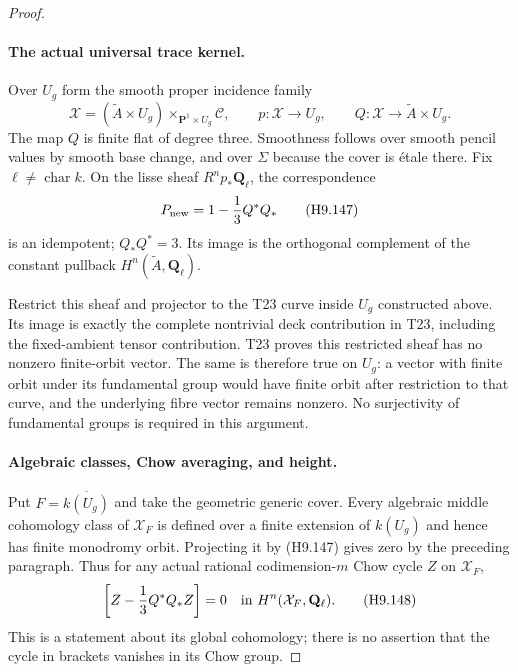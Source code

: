 \begin{proof}
\paragraph{The actual universal trace kernel.}
Over $U_g$ form the smooth proper incidence family
\[
 \mathscr X=(\widetilde A\times U_g)
                    \times_{\mathbf P^1\times U_g}\mathscr C,
 \qquad p:\mathscr X\to U_g,
 \qquad Q:\mathscr X\to\widetilde A\times U_g.
                                                               \tag{H9.146}
\]
The map $Q$ is finite flat of degree three.
Smoothness follows over smooth pencil values by
smooth base change, and over $\Sigma$ because
the cover is \'etale there. Fix $\ell\ne\operatorname{char}k$.
On the lisse sheaf $R^np_*\mathbf Q_\ell$, the
correspondence
\[
                       P_{\rm new}=1-\frac13Q^*Q_*
                                                               \tag{H9.147}
\]
is an idempotent; $Q_*Q^*=3$. Its image is the
orthogonal complement of the constant pullback
$H^n(\widetilde A,\mathbf Q_\ell)$.

Restrict this sheaf and projector to the T23 curve
inside $U_g$ constructed above. Its image is exactly
the complete nontrivial deck contribution in T23,
including the fixed-ambient tensor contribution.
T23 proves this restricted sheaf has no nonzero
finite-orbit vector. The same is therefore true on
$U_g$: a vector with finite orbit under its
fundamental group would have finite orbit after
restriction to that curve, and the underlying
fibre vector remains nonzero. No surjectivity of
fundamental groups is required in this argument.

\paragraph{Algebraic classes, Chow averaging, and height.}
Put $F=\overline{k(U_g)}$ and take the geometric
generic cover. Every algebraic middle cohomology
class of $\mathcal X_F$ is defined over a finite
extension of $k(U_g)$ and hence has finite
monodromy orbit. Projecting it by (H9.147) gives
zero by the preceding paragraph. Thus for any
actual rational codimension-$m$ Chow cycle $Z$ on $\mathcal X_F$,
\[
           \left[Z-\frac13Q^*Q_*Z\right]=0
                       \quad\hbox{in }H^n(\mathcal X_F,\mathbf Q_\ell).
                                                               \tag{H9.148}
\]
This is a statement about its global cohomology;
there is no assertion that the cycle in brackets
vanishes in its Chow group.


\end{proof}
